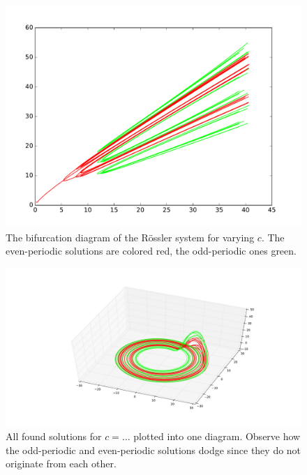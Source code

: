\begin{figure}[!ht]
	\centering
	\includegraphics[width=1\textwidth]{img/roessler2a.pdf}
	\caption{The bifurcation diagram of the Rössler system for varying $c$. The
		even-periodic solutions are colored red, the odd-periodic ones green.}
\end{figure}

\begin{figure}[!ht]
	\centering
	\includegraphics[width=1\textwidth]{img/roessler2b.pdf}
	\caption{All found solutions for $c=\dots$ plotted into one diagram.
	Observe how the odd-periodic and even-periodic solutions dodge since they do not
	originate from each other.}
\end{figure}



